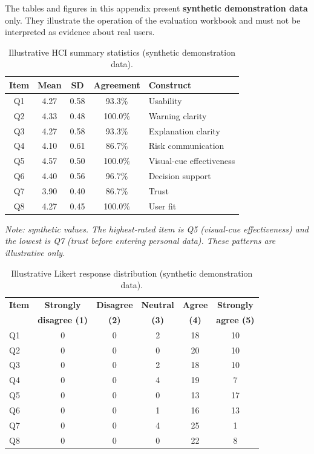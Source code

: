 \documentclass[11pt,a4paper]{article}
\begin{document}
The tables and figures in this appendix present \textbf{synthetic demonstration data} only.
They illustrate the operation of the evaluation workbook and must not be interpreted as evidence
about real users.

\begin{table}[H]
\caption{Illustrative HCI summary statistics (synthetic demonstration data).}
\label{tab:hci-summary}
\centering\footnotesize
\begin{tabular}{ccccl}
\toprule
\textbf{Item} & \textbf{Mean} & \textbf{SD} & \textbf{Agreement} & \textbf{Construct} \\
\midrule
Q1 & 4.27 & 0.58 & 93.3\%  & Usability \\
Q2 & 4.33 & 0.48 & 100.0\% & Warning clarity \\
Q3 & 4.27 & 0.58 & 93.3\%  & Explanation clarity \\
Q4 & 4.10 & 0.61 & 86.7\%  & Risk communication \\
Q5 & 4.57 & 0.50 & 100.0\% & Visual-cue effectiveness \\
Q6 & 4.40 & 0.56 & 96.7\%  & Decision support \\
Q7 & 3.90 & 0.40 & 86.7\%  & Trust \\
Q8 & 4.27 & 0.45 & 100.0\% & User fit \\
\bottomrule
\end{tabular}
\end{table}

\noindent\footnotesize\textit{Note: synthetic values. The highest-rated item is Q5 (visual-cue
effectiveness) and the lowest is Q7 (trust before entering personal data). These patterns are
illustrative only.}\normalsize

\begin{table}[H]
\caption{Illustrative Likert response distribution (synthetic demonstration data).}
\label{tab:hci-dist}
\centering\footnotesize
\begin{tabular}{lccccc}
\toprule
\textbf{Item} & \textbf{Strongly} & \textbf{Disagree} & \textbf{Neutral} & \textbf{Agree} & \textbf{Strongly} \\
              & \textbf{disagree (1)} & \textbf{(2)} & \textbf{(3)} & \textbf{(4)} & \textbf{agree (5)} \\
\midrule
Q1 & 0 & 0 & 2 & 18 & 10 \\
Q2 & 0 & 0 & 0 & 20 & 10 \\
Q3 & 0 & 0 & 2 & 18 & 10 \\
Q4 & 0 & 0 & 4 & 19 & 7 \\
Q5 & 0 & 0 & 0 & 13 & 17 \\
Q6 & 0 & 0 & 1 & 16 & 13 \\
Q7 & 0 & 0 & 4 & 25 & 1 \\
Q8 & 0 & 0 & 0 & 22 & 8 \\
\bottomrule
\end{tabular}
\end{table}
\end{document}
